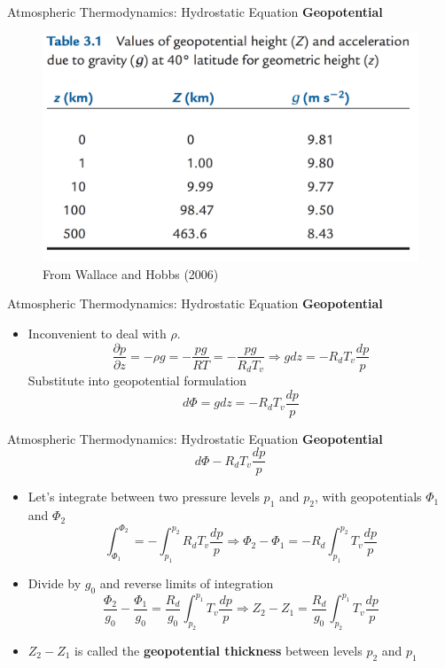 \begin{frame}{Atmospheric Thermodynamics: Hydrostatic Equation}
\textbf{Geopotential}
\begin{figure}
	\includegraphics[width=\textwidth]{fig2}
	\centering \small From Wallace and Hobbs (2006)
\end{figure}
\end{frame}

\begin{frame}{Atmospheric Thermodynamics: Hydrostatic Equation}
\textbf{Geopotential}
\begin{itemize}
	\item Inconvenient to deal with $\rho$.
	$$\frac{\partial p}{\partial z} = -\rho g = -\frac{pg}{RT} = -\frac{pg}{R_dT_v}\Rightarrow gdz = -R_dT_v\frac{dp}{p}$$
	Substitute into geopotential formulation
	$$d\Phi = gdz = -R_dT_v\frac{dp}{p}$$
\end{itemize}
\end{frame}
\begin{frame}{Atmospheric Thermodynamics: Hydrostatic Equation}
\textbf{Geopotential}
$$d\Phi -R_dT_v\frac{dp}{p}$$
\begin{itemize}
	\item Let's integrate between two pressure levels $p_1$ and $p_2$, with geopotentials $\Phi_1$ and $\Phi_2$
	$$\int^{\Phi_2}_{\Phi_1} = -\int^{p_2}_{p_1} R_d T_v \frac{dp}{p} \Rightarrow \Phi_2 - \Phi_1 = -R_d \int^{p_2}_{p_1} T_v \frac{dp}{p}$$
	\item Divide by $g_0$ and reverse limits of integration
	$$\frac{\Phi_2}{g_0} - \frac{\Phi_1}{g_0} = \frac{R_d}{g_0} \int^{p_1}_{p_2} T_v \frac{dp}{p}\Rightarrow Z_2 - Z_1 = \frac{R_d}{g_0} \int^{p_1}_{p_2} T_v \frac{dp}{p}$$
	\item $Z_2 - Z_1$ is called the \textbf{geopotential thickness} between levels $p_2$ and $p_1$
\end{itemize}
\end{frame}





